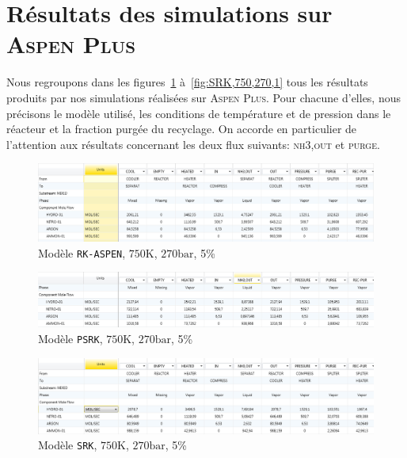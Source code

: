 \section{Résultats des simulations sur \textsc{Aspen Plus}}
\label{sec:aspen_simulation}

Nous regroupons dans les figures~\ref{fig:RK-ASPEN} à~\ref{fig:SRK,750,270,1}
tous les résultats produits par nos simulations réalisées sur \textsc{Aspen Plus}. 
Pour chacune d'elles, nous précisons le modèle utilisé,
les conditions de température et de pression dans le réacteur 
et la fraction purgée du recyclage. 
On accorde en particulier de l'attention aux résultats 
concernant les deux flux suivants: \textsc{nh3,out} et \textsc{purge}.

\begin{figure}[h!]
	\begin{center}
		\includegraphics[scale=0.5]{../tache2/img_aspen/RK-ASPEN.png}
	\end{center}
	\caption{Modèle \texttt{RK-ASPEN}, $750\si{\kelvin}$, $270\si{\bar}$, 5\%}
	\label{fig:RK-ASPEN}
\end{figure}

\begin{figure}[h!]
	\begin{center}
		\includegraphics[scale=0.5]{../tache2/img_aspen/PSRK.png}
	\end{center}
	\caption{Modèle \texttt{PSRK}, $750\si{\kelvin}$, $270\si{\bar}$, 5\%}
	\label{fig:PSRK}
\end{figure}

\begin{figure}[h!]
	\begin{center}
		\includegraphics[scale=0.5]{../tache2/img_aspen/SRK,750,270,5.png}
	\end{center}
	\caption{Modèle \texttt{SRK}, $750\si{\kelvin}$, $270\si{\bar}$, 5\%}
	\label{fig:SRK,750,270,0.05}
\end{figure}

